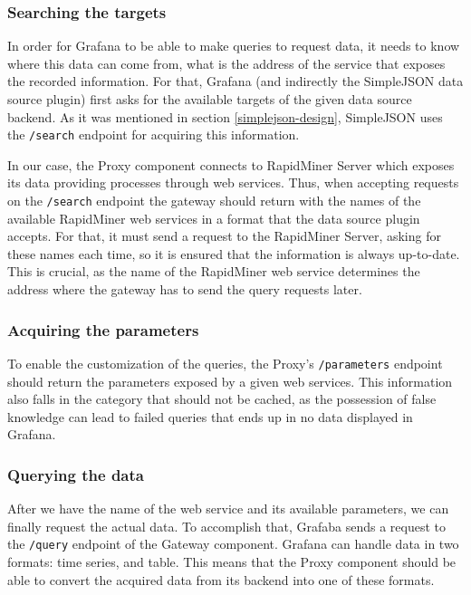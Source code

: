 \subsubsection{Searching the targets}

In order for Grafana to be able to make queries to request data, it needs to know where this data can come from, what is the address of the service that exposes the recorded information. For that, Grafana (and indirectly the SimpleJSON data source plugin) first asks for the available targets of the given data source backend. As it was mentioned in section \ref{simplejson-design}, SimpleJSON uses the \texttt{/search} endpoint for acquiring this information.

In our case, the Proxy component connects to RapidMiner Server which exposes its data providing processes through web services. Thus, when accepting requests on the \texttt{/search} endpoint the gateway should return with the names of the available RapidMiner web services in a format that the data source plugin accepts. For that, it must send a request to the RapidMiner Server, asking for these names each time, so it is ensured that the information is always up-to-date. This is crucial, as the name of the RapidMiner web service determines the address where the gateway has to send the query requests later.

\subsubsection{Acquiring the parameters}

To enable the customization of the queries, the Proxy's \texttt{/parameters} endpoint should return the parameters exposed by a given web services. This information also falls in the category that should not be cached, as the possession of false knowledge can lead to failed queries that ends up in no data displayed in Grafana.

\subsubsection{Querying the data}
After we have the name of the web service and its available parameters, we can finally request the actual data. To accomplish that,  Grafaba sends a request to the \texttt{/query} endpoint of the Gateway component. Grafana can handle data in two formats: time series, and table. This means that the Proxy component should be able to convert the acquired data from its backend into one of these formats.

